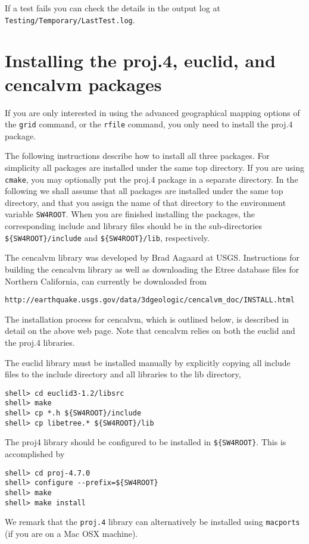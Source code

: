 \documentclass[11pt]{article}
\begin{document}
If a test fails you can check the details in the output log at
\texttt{Testing/Temporary/LastTest.log}.

\section{Installing the proj.4, euclid, and cencalvm packages}\label{sec:cencalvm-install}
 

If you are only interested in using the advanced geographical mapping options of the {\tt grid} command,
or the {\tt rfile} command, you only need to install the proj.4 package.

The following instructions describe how to install all three packages. For simplicity all packages
are installed under the same top directory. If you are using {\tt cmake}, you may optionally put the
proj.4 package in a separate directory. In the following we shall assume that all packages are
installed under the same top directory, and that you assign the name of that directory to the
environment variable \verb+SW4ROOT+. When you are finished installing the packages, the
corresponding include and library files should be in the sub-directories \verb+${SW4ROOT}/include+
and \verb+${SW4ROOT}/lib+, respectively.

The cencalvm library was developed by Brad Aagaard at USGS. Instructions for building the cencalvm
library as well as downloading the Etree database files for Northern California, can
currently be downloaded from
\begin{verbatim}
http://earthquake.usgs.gov/data/3dgeologic/cencalvm_doc/INSTALL.html
\end{verbatim}
The installation process for cencalvm, which is outlined below, is described in detail on the above
web page.  Note that cencalvm relies on both the euclid and the proj.4 libraries.

The euclid library must be installed manually by explicitly copying all include files to
the include directory and all libraries to the lib directory,
\begin{verbatim}
shell> cd euclid3-1.2/libsrc
shell> make
shell> cp *.h ${SW4ROOT}/include
shell> cp libetree.* ${SW4ROOT}/lib
\end{verbatim}
The proj4 library should be configured to be installed in \verb+${SW4ROOT}+. This is accomplished by
\begin{verbatim}
shell> cd proj-4.7.0
shell> configure --prefix=${SW4ROOT}
shell> make
shell> make install
\end{verbatim}
We remark that the {\tt proj.4} library can alternatively be installed using {\tt macports} (if you are
on a Mac OSX machine).
\end{document}
